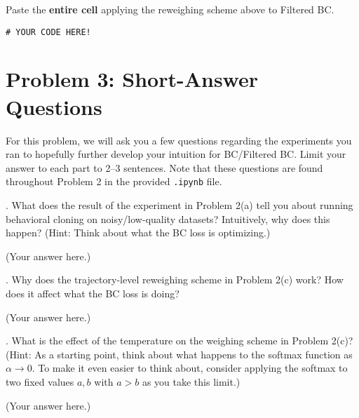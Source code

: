 \documentclass[12pt]{article}
\begin{document}
            \noindent
            Paste the \textbf{entire cell} applying the reweighing scheme above to Filtered BC.
            \begin{solution}
                \begin{verbatim}
# YOUR CODE HERE!
                \end{verbatim}
            \end{solution}

        \clearpage

    \section*{Problem 3: Short-Answer Questions}

        For this problem, we will ask you a few questions regarding the experiments you ran to hopefully further develop your intuition for BC/Filtered BC.
        Limit your answer to each part to 2--3 sentences.
        Note that these questions are found throughout Problem 2 in the provided \verb+.ipynb+ file.

        \vspace{1ex}
        
        . What does the result of the experiment in Problem 2(a) tell you about running behavioral cloning on noisy/low-quality datasets? Intuitively, why does this happen? \newline 
        (Hint: Think about what the BC loss is optimizing.)
        \begin{solution}
            (Your answer here.)
        \end{solution}

        . Why does the trajectory-level reweighing scheme in Problem 2(c) work? How does it affect what the BC loss is doing?
        \begin{solution}
            (Your answer here.)
        \end{solution}

        . What is the effect of the temperature on the weighing scheme in Problem 2(c)? \newline
        (Hint: As a starting point, think about what happens to the softmax function as $\alpha \to 0$. To make it even easier to think about, consider applying the softmax to two fixed values $a, b$ with $a > b$ as you take this limit.)
        \begin{solution}
            (Your answer here.)
        \end{solution}
\end{document}
